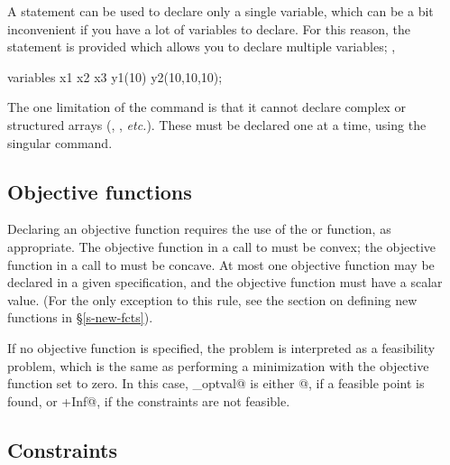 \documentclass[12pt]{article}
\begin{document}
A \verb@variable@ statement can be used to declare only a single
variable, which can be a bit inconvenient if you have a lot of variables
to declare. For this reason, the \verb@variables@ statement
is provided which allows you to declare multiple variables; \ie,
\begin{code}
	variables x1 x2 x3 y1(10) y2(10,10,10);
\end{code}
The one limitation of the \verb@variables@ command is that it cannot
declare complex or structured arrays (\eg, \verb@symmetric@,
\emph{etc.}). These must be declared
one at a time, using the singular \verb@variable@ command.

\subsection{Objective functions}

Declaring an objective function requires
the use of the \verb@minimize@ or \verb@maximize@ function, as
appropriate.  The objective function in a call to \verb@minimize@ 
must be convex; the objective function in a call to \verb@maximize@
must be concave. At most one objective function may be declared in a 
given \cvx specification, and the objective function must have a
scalar value. (For the only exception to this rule, see the 
section on defining new functions in \S\ref{s-new-fcts}).

If no objective function is specified, the problem is interpreted
as a feasibility problem, which is the same as performing a minimization
with the objective function set to zero. In this case, \verb@cvx_optval@
is either @, if a feasible point is found, or
\verb@+Inf@, if the constraints are not feasible.

\subsection{Constraints}
\end{document}

